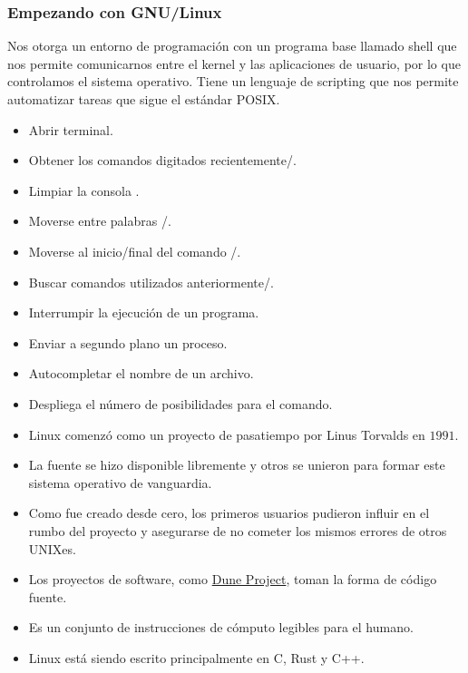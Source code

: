 \begin{frame}
	\frametitle{Empezando con GNU/Linux}
	Nos otorga un entorno de programación con un programa base llamado shell que nos permite comunicarnos entre el kernel y las aplicaciones de usuario, por lo que controlamos el sistema operativo.
	Tiene un lenguaje de scripting que nos permite automatizar tareas que sigue el estándar POSIX.

	\begin{itemize}
		\item Abrir terminal\quad{}.
		\item Obtener los comandos digitados recientemente\quad\keys{\arrowkeyup}/\keys{\arrowkeydown}.
		\item Limpiar la consola \quad{}.
		\item Moverse entre palabras \quad{}/.
		\item Moverse al inicio/final del comando \quad{}/.
		\item Buscar comandos utilizados anteriormente\quad{}/.
		\item Interrumpir la ejecución de un programa\quad{}.
		\item Enviar a segundo plano un proceso\quad{}.
		\item Autocompletar el nombre de un archivo\quad\keys{\tab}.
		\item Despliega el número de posibilidades para el comando\quad\keys{\tab+\tab}.
	\end{itemize}
\end{frame}


\begin{frame}
	\begin{itemize}
		\item
		      Linux comenzó como un proyecto de pasatiempo por Linus Torvalds en $1991$.
		\item
		      La fuente se hizo disponible libremente y otros se unieron para formar este sistema operativo de vanguardia.
		\item
		      Como fue creado desde cero, los primeros usuarios pudieron influir en el rumbo del proyecto y asegurarse de no cometer los mismos errores de otros UNIXes.
		\item
		      Los proyectos de software, como \href{https://dune-project.org}{Dune Project}, toman la forma de código fuente.
		\item
		Es un conjunto de instrucciones de cómputo legibles para el humano.
		\item Linux está siendo escrito principalmente en C, Rust y C++.
	\end{itemize}
\end{frame}


